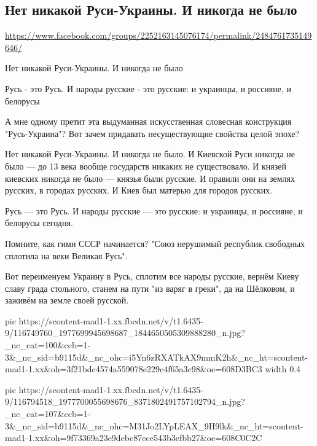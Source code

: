  
 
 
 
 

\subsection{Нет никакой Руси-Украины. И никогда не было}
\label{sec:30_06_2020.fb.nyrtsov_vladimir.1.kievrus}

\url{https://www.facebook.com/groups/2252163145076174/permalink/2484761735149646/}

Нет никакой Руси-Украины. И никогда не было

Русь - это Русь. И народы русские - это русские: и украинцы, и россияне, и белорусы

А мне одному претит эта выдуманная искусственная словесная конструкция
"Русь-Украина"? Вот зачем придавать несуществующие свойства целой эпохе?

Нет никакой Руси-Украины. И никогда не было. И Киевской Руси никогда не было —
до 13 века вообще государств никаких не существовало. И князей киевских никогда
не было — князья были русские. И правили они на землях русских, в городах
русских. И Киев был матерью для городов русских.

Русь — это Русь. И народы русские — это русские: и украинцы, и россияне, и
белорусы сегодня.

Помните, как гимн СССР начинается? "Союз нерушимый республик свободных сплотила
на веки Великая Русь".

Вот переименуем Украину в Русь, сплотим все народы русские, вернём Киеву славу
града стольного, станем на пути "из варяг в греки", да на Шёлковом, и заживём
на земле своей русской.

\ifcmt
  pic https://scontent-mad1-1.xx.fbcdn.net/v/t1.6435-9/116749760_1977699945698687_1844650505309888280_n.jpg?_nc_cat=100&ccb=1-3&_nc_sid=b9115d&_nc_ohc=i5Yn6zRXATkAX9mmK2h&_nc_ht=scontent-mad1-1.xx&oh=3f21bdc4574a559078e229c4f65a3c98&oe=608D3BC3
  width 0.4
	
  pic https://scontent-mad1-1.xx.fbcdn.net/v/t1.6435-9/116794518_1977700055698676_8371802491757102794_n.jpg?_nc_cat=107&ccb=1-3&_nc_sid=b9115d&_nc_ohc=M31Jo2LYpLEAX_9H9lk&_nc_ht=scontent-mad1-1.xx&oh=9f73369a23e9debc87ece543b3efbb27&oe=608C0C2C	

